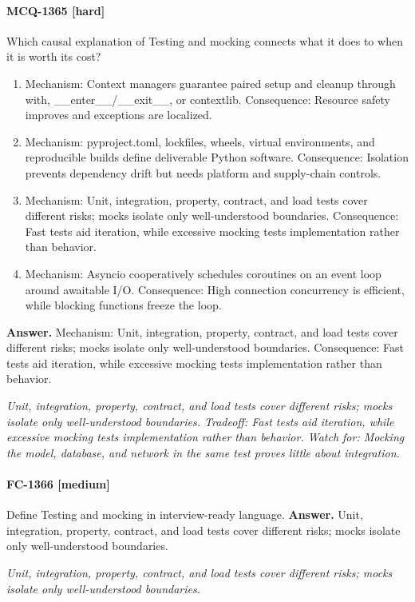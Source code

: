 \paragraph{MCQ-1365 [hard]} Which causal explanation of Testing and mocking connects what it does to when it is worth its cost?
\begin{enumerate}[label=\Alph*.]
\item Mechanism: Context managers guarantee paired setup and cleanup through with, \_\_enter\_\_/\_\_exit\_\_, or contextlib. Consequence: Resource safety improves and exceptions are localized.
\item Mechanism: pyproject.toml, lockfiles, wheels, virtual environments, and reproducible builds define deliverable Python software. Consequence: Isolation prevents dependency drift but needs platform and supply-chain controls.
\item Mechanism: Unit, integration, property, contract, and load tests cover different risks; mocks isolate only well-understood boundaries. Consequence: Fast tests aid iteration, while excessive mocking tests implementation rather than behavior.
\item Mechanism: Asyncio cooperatively schedules coroutines on an event loop around awaitable I/O. Consequence: High connection concurrency is efficient, while blocking functions freeze the loop.
\end{enumerate}
\noindent\textbf{Answer.} Mechanism: Unit, integration, property, contract, and load tests cover different risks; mocks isolate only well-understood boundaries. Consequence: Fast tests aid iteration, while excessive mocking tests implementation rather than behavior.
\par\textit{Unit, integration, property, contract, and load tests cover different risks; mocks isolate only well-understood boundaries. Tradeoff: Fast tests aid iteration, while excessive mocking tests implementation rather than behavior. Watch for: Mocking the model, database, and network in the same test proves little about integration.}
\paragraph{FC-1366 [medium]} Define Testing and mocking in interview-ready language.
\noindent\textbf{Answer.} Unit, integration, property, contract, and load tests cover different risks; mocks isolate only well-understood boundaries.
\par\textit{Unit, integration, property, contract, and load tests cover different risks; mocks isolate only well-understood boundaries.}

